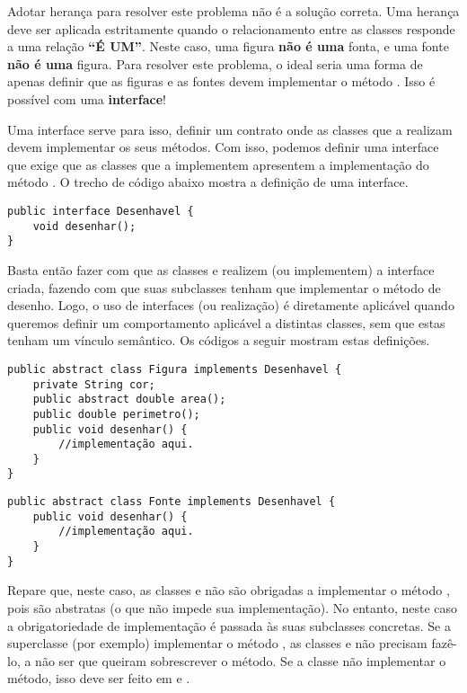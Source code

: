 Adotar herança para resolver este problema não é a solução correta. Uma herança deve ser aplicada estritamente quando o relacionamento entre as classes responde a uma relação \textbf{``É UM''}. Neste caso, uma figura \textbf{não é uma} fonta, e uma fonte \textbf{não é uma} figura. Para resolver este problema, o ideal seria uma forma de apenas definir que as figuras e as fontes devem implementar o método . Isso é possível com uma \textbf{interface}!

Uma interface serve para isso, definir um contrato onde as classes que a realizam devem implementar os seus métodos. Com isso, podemos definir uma interface  que exige que as classes que a implementem apresentem a implementação do método . O trecho de código abaixo mostra a definição de uma interface.

\begin{verbatim}
public interface Desenhavel {
	void desenhar();
}
\end{verbatim}

Basta então fazer com que as classes  e  realizem (ou implementem) a interface criada, fazendo com que suas subclasses tenham que implementar o método de desenho. Logo, o uso de interfaces (ou realização) é diretamente aplicável quando queremos definir um comportamento aplicável a distintas classes, sem que estas tenham um vínculo semântico. Os códigos a seguir mostram estas definições.

\begin{verbatim}
public abstract class Figura implements Desenhavel {
	private String cor;
	public abstract double area();
	public double perimetro();
	public void desenhar() {
		//implementação aqui.
	}
}
\end{verbatim}

\begin{verbatim}
public abstract class Fonte implements Desenhavel {
	public void desenhar() {
		//implementação aqui.
	}
}
\end{verbatim}

Repare que, neste caso, as classes  e  não são obrigadas a implementar o método , pois são abstratas (o que não impede sua implementação). No entanto, neste caso a obrigatoriedade de implementação é passada às suas subclasses concretas. Se a superclasse  (por exemplo) implementar o método , as classes  e  não precisam fazê-lo, a não ser que queiram sobrescrever o método. Se a classe  não implementar o método, isso deve ser feito em  e .

